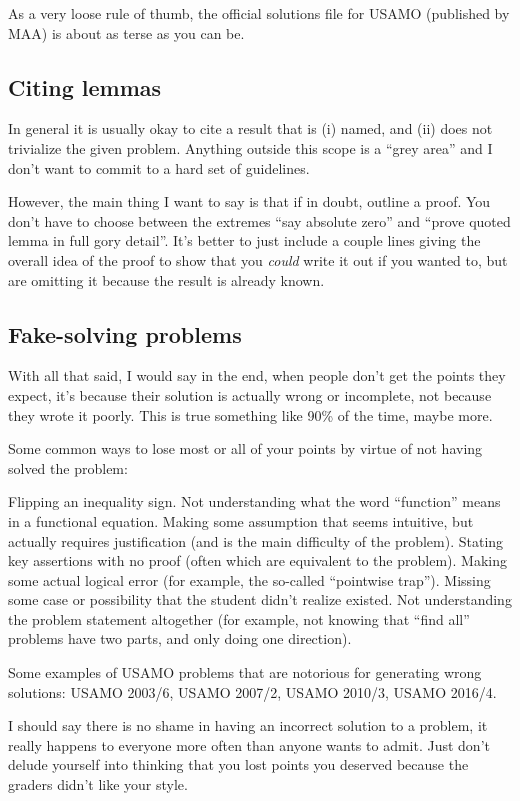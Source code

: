 \documentclass[11pt]{scrartcl}
\begin{document}
As a very loose rule of thumb,
the official solutions file for USAMO (published by MAA)
is about as terse as you can be.

\subsection{Citing lemmas}
In general it is usually okay to cite a result that is
(i) named, and (ii) does not trivialize the given problem.
Anything outside this scope is a ``grey area''
and I don't want to commit to a hard set of guidelines.

However, the main thing I want to say is that
\alert{if in doubt, outline a proof}.
You don't have to choose between the extremes
``say absolute zero'' and ``prove quoted lemma in full gory detail''.
It's better to just include a couple lines giving the overall idea of the proof
to show that you \emph{could} write it out if you wanted to,
but are omitting it because the result is already known.


\subsection{Fake-solving problems}
With all that said, I would say in the end,
when \alert{people don't get the points they expect,
it's because their solution is actually wrong or incomplete},
not because they wrote it poorly.
This is true something like 90\% of the time, maybe more.

Some common ways to lose most or all of your points
by virtue of not having solved the problem:
\begin{itemize}
	\ii Flipping an inequality sign.
	\ii Not understanding what the word ``function'' means
	in a functional equation.
	\ii Making some assumption that seems intuitive,
	but actually requires justification (and is the main difficulty of the problem).
	\ii Stating key assertions with no proof
	(often which are equivalent to the problem).
	\ii Making some actual logical error
	(for example, the so-called ``pointwise trap'').
	\ii Missing some case or possibility that the student didn't realize existed.
	\ii Not understanding the problem statement altogether
	(for example, not knowing that ``find all'' problems have two parts,
	and only doing one direction).
\end{itemize}
Some examples of USAMO problems that are notorious for generating wrong solutions:
USAMO 2003/6, USAMO 2007/2, USAMO 2010/3, USAMO 2016/4.

I should say there is no shame in having an incorrect solution to a problem,
it really happens to everyone more often than anyone wants to admit.
Just don't delude yourself into thinking that you lost points
you deserved because the graders didn't like your style.
\end{document}
